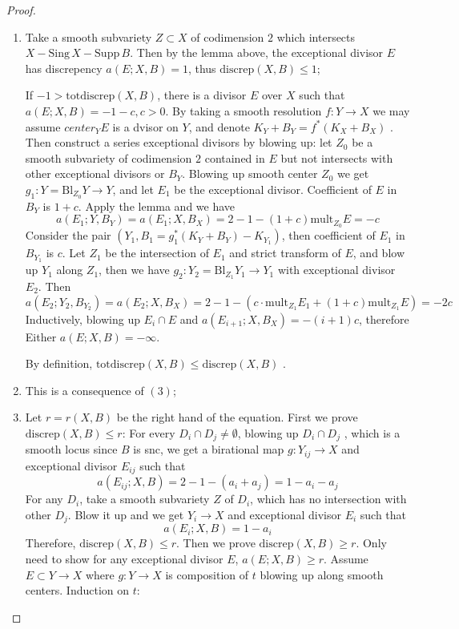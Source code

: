 \documentclass{article}
\begin{document}
\begin{proof}
  \begin{enumerate}[(1)]
    \item Take a smooth subvariety $ Z\subset X $ of codimension $ 2 $ which intersects $ X-\mathrm{Sing}\,X-\mathrm{Supp}\,B $. Then by the lemma above, the exceptional divisor $ E $ has discrepency $ a(E;X,B)=1 $, thus $ \mathrm{discrep }(X,B)\leqslant 1  $;
    
    If $ -1>\mathrm{totdiscrep}(X,B) $, there is a divisor $ E$ over $ X $ such that $ a(E;X,B)=-1-c,c>0 $. By taking a smooth resolution $ f:Y\to X $ we may assume $ center_YE $ is a dvisor on $ Y $, and denote $ K_Y+B_Y=f^*(K_X+B_X)$ . Then construct a series exceptional divisors by blowing up: let $ Z_0 $ be a smooth subvariety of codimension $ 2 $ contained in $ E $ but not intersects with other exceptional divisors or $ B_Y $. Blowing up smooth center $ Z_0 $  we get $ g_1:Y=\mathrm{Bl}_{Z_0}Y\to Y $, and let $ E_1 $ be the exceptional divisor. Coefficient of $ E $ in $ B_Y $ is $ 1+c $. Apply the lemma and we have 
    \[ a(E_1;Y,B_Y)=a(E_1;X,B_X)=2-1-(1+c)\mathrm{mult}_{Z_0}E=-c \]
    Consider the pair $ (Y_1,B_1=g_1^*(K_Y+B_Y)-K_{Y_1}) $, then coefficient of $ E_1 $ in $ B_{Y_1} $ is $ c $. Let $ Z_1 $ be the intersection of $ E_1 $ and strict transform of $ E $,  and blow up $ Y_1 $ along $ Z_1 $, then we have $ g_2:Y_2=\mathrm{Bl}_{Z_1}Y_1\to Y_1 $ with exceptional divisor $ E_2 $. Then
    $$ a(E_2;Y_2,B_{Y_2})=a(E_2;X,B_X)=2-1-(c\cdot\mathrm{mult}_{Z_1}E_1+(1+c)\mathrm{mult}_{Z_1}E)=-2c $$  
    Inductively, blowing up $ E_i\cap E $ and $ a(E_{i+1};X,B_X)=-(i+1)c $, therefore Either $ a(E;X,B)=-\infty $.
    
    By definition, $ \mathrm{totdiscrep}(X,B)\leqslant \mathrm{discrep }(X,B) $ .
    \item This is a consequence of $ (3) $;
    \item Let $ r=r(X,B) $ be the right hand of the equation. First we prove $ \mathrm{discrep}(X,B)\leqslant r $: For every $ D_i\cap D_j\neq \emptyset $, blowing up $ D_i\cap D_j $ , which is a smooth locus since $ B $ is snc, we get a birational map $ g:Y_{ij}\to X $ and exceptional divisor $ E_{ij} $ such that 
    \[ a(E_{ij};X,B)=2-1-(a_i+a_j)=1-a_i-a_j \]
    For any $ D_i $, take a smooth subvariety $ Z $ of $ D_i $, which has no intersection with other $ D_j $. Blow it up and we get $ Y_i\to X $ and exceptional divisor $ E_i $ such that
    \[ a(E_i;X,B)=1-a_i \]
    Therefore,  $ \mathrm{discrep}(X,B)\leqslant r $.
    Then we prove $ \mathrm{discrep}(X,B)\geqslant r $. Only need to show for any exceptional divisor $ E $, $ a(E;X,B)\geqslant r $. Assume $ E\subset Y\to X $ where $ g:Y\to X $ is composition of $ t $ blowing up along smooth centers. Induction on $ t $: 
    

\end{enumerate}
\end{proof}
\end{document}
